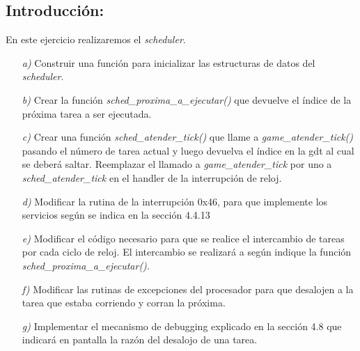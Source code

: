 \subsection{Introducción:}

En este ejercicio realizaremos el \textit{scheduler}.

\begin{itemize}

\item [\textit{a)}]  Construir una función para inicializar las estructuras de datos del \textit{scheduler}.

\item [\textit{b)}] Crear la función  \textit{sched\_proxima\_a\_ejecutar()} que devuelve el  índice de la próxima tarea a ser ejecutada. 

\item [\textit{c)}]  Crear una función \textit{sched\_atender\_tick()} que llame a \textit{game\_atender\_tick()} pasando el número de tarea actual y luego devuelva el índice en la gdt al cual se deberá saltar. Reemplazar el llamado a \textit{game\_atender\_tick} por uno a \textit{sched\_atender\_tick} en el handler de la interrupción de reloj.

\item [\textit{d)}] Modificar la rutina de la interrupción 0x46, para que implemente los servicios según se indica en la sección 4.4.13

\item [\textit{e)}]  Modificar el código necesario para que se realice el intercambio de tareas por cada ciclo de reloj. El intercambio se realizará a según indique la función \textit{sched\_proxima\_a\_ejecutar().}

\item [\textit{f)}]  Modificar las rutinas de excepciones del procesador para que desalojen a la tarea que estaba corriendo y corran la próxima.

\item [\textit{g)}] Implementar el mecanismo de debugging explicado en la sección 4.8 que indicará en pantalla la razón del desalojo de una tarea.


\end{itemize}